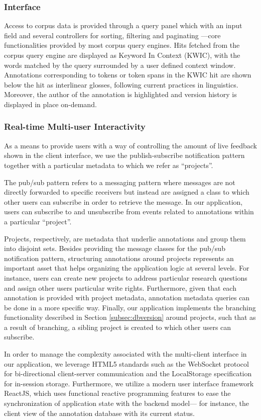 \documentclass{sig-alternate}
\begin{document}
\subsubsection{Interface}
Access to corpus data is provided through a query panel which with an input field and several
controllers for sorting, filtering and paginating ---core functionalities provided by
most corpus query engines. Hits fetched from the corpus query engine are displayed as Keyword
In Context (KWIC), with the words matched by the query surrounded by a user defined context window.
Annotations corresponding to tokens or token spans in the KWIC hit are shown below the hit as
interlinear glosses, following current practices in linguistics. 
Moreover, the author of the annotation is highlighted and version history is displayed in place
on-demand.

\subsubsection{Real-time Multi-user Interactivity}
As a means to provide users with a way of controlling the amount of live feedback shown in the
client interface, we use the publish-subscribe notification pattern together with a particular
metadata to which we refer as ``projects''.

The pub/sub pattern refers to a messaging pattern where messages are not directly forwarded to
specific receivers but instead are assigned a class to which other users can subscribe in order to
retrieve the message. In our application, users can subscribe to and unsubscribe from events related
to annotations within a particular ``project''.

Projects, respectively, are metadata that underlie annotations and group them into disjoint sets.
Besides providing the message classes for the pub/sub notification pattern, structuring annotations
around projects represents an important asset that helps organizing the application logic at
several levels. For instance, users can create new projects to address particular research questions
and assign other users particular write rights. Furthermore, given that each annotation is provided
with project metadata, annotation metadata queries can be done in a more specific way.
Finally, our application implements the branching functionality described in Section
\ref{subsec:dbversion} around projects, such that as a result of branching, a sibling project is
created to which other users can subscribe.

In order to manage the complexity associated with the multi-client interface in our application,
we leverage HTML5 standards such as the WebSocket protocol for bi-directional client-server
communication and the LocalStorage specification for in-session storage. Furthermore, we utilize
a modern user interface framework ReactJS, which uses functional reactive programming features to
ease the synchronization of application state with the backend model--- for instance, the
client view of the annotation database with its current status.
\end{document}
